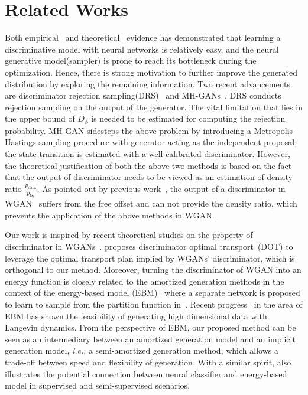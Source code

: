 \documentclass{article}
\begin{document}
\section{Related Works}
Both empirical~\cite{arjovsky2017wasserstein} and theoretical~\cite{heusel2017gans} evidence has demonstrated that learning a discriminative model with neural networks is relatively easy, and the neural generative model(sampler) is prone to reach its bottleneck during the optimization. Hence, there is strong motivation to further improve the generated distribution by exploring the remaining information. Two recent advancements are discriminator rejection sampling(DRS)~\cite{azadi2018discriminator} and MH-GANs~\cite{turner2018metropolis}. DRS conducts rejection sampling on the output of the generator. The vital limitation that lies in the upper bound of $D_\phi$ is needed to be estimated for computing the rejection probability. MH-GAN sidesteps the above problem by introducing a Metropolis-Hastings sampling procedure with generator acting as the independent proposal; the state transition is estimated with a well-calibrated discriminator. However, the theoretical justification of both the above two methods is based on the fact that the output of discriminator needs to be viewed as an estimation of density ratio $\frac{p_{\text{data}}}{p_{G_\theta}}$. As pointed out by previous work~\cite{zhou2019lipschitz}, the output of a discriminator in WGAN~\cite{arjovsky2017wasserstein} suffers from the free offset and can not provide the density ratio, which prevents the application of the above methods in WGAN. 

Our work is inspired by recent theoretical studies on the property of discriminator in WGANs~\cite{gulrajani2017improved,zhou2019lipschitz}. \cite{tanaka2019discriminator} proposes discriminator optimal transport~(DOT) to leverage the optimal transport plan implied by WGANs' discriminator, which is orthogonal to our  method. 
Moreover, turning the discriminator of WGAN into an energy function is closely related to the amortized generation methods in the context of the energy-based model (EBM)~\cite{kim2016deep,zhao2016energy,kumar2019maximum} where a separate network is proposed to learn to sample from the partition function in~\cite{finn2016connection}. Recent progress~\cite{song2019generative,du2019implicit} in the area of EBM has shown the feasibility of generating high dimensional data with Langevin dynamics. From the perspective of EBM, our proposed method can be seen as an intermediary between an amortized generation model and an implicit generation model, \emph{i.e.}, a semi-amortized generation method, which allows a trade-off between speed and flexibility of generation.  With a similar spirit, \cite{grathwohl2019your}  also illustrates the potential connection between neural classifier and energy-based model in supervised and semi-supervised scenarios.  
\end{document}
